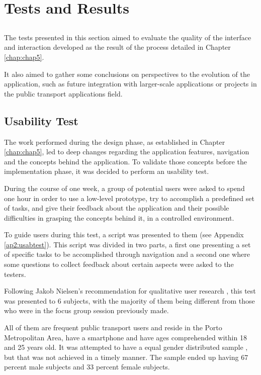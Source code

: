 \chapter{Tests and Results} \label{chap:chap6}

\section*{}

The tests presented in this section aimed to evaluate the quality of the interface and interaction developed as the result of the process detailed in Chapter \ref{chap:chap5}. 

It also aimed to gather some conclusions on perspectives to the evolution of the application, such as future integration with larger-scale applications or projects in the public transport applications field.

\section{Usability Test}

The work performed during the design phase, as established in Chapter \ref{chap:chap5}, led to deep changes regarding the application features, navigation and the concepts behind the application. To validate those concepts before the implementation phase, it was decided to perform an usability test.


During the course of one week, a group of potential users were asked to spend one hour in order to use a low-level prototype, try to accomplish a predefined set of tasks, and give their feedback about the application and their possible difficulties in grasping the concepts behind it, in a controlled environment.

To guide users during this test, a script was presented to them (see Appendix \ref{ap2:usabtest}). This script was divided in two parts, a first one presenting a set of specific tasks to be accomplished through navigation and a second one where some questions to collect feedback about certain aspects were asked to the testers.

Following Jakob Nielsen's recommendation for qualitative user research \cite{kn:NB12}, this test was presented to 6 subjects, with the majority of them being different from those who were in the focus group session previously made.

All of them are frequent public transport users and reside in the Porto Metropolitan Area, have a smartphone and have ages comprehended within 18 and 25 years old. It was attempted to have a equal gender distributed sample , but that was not achieved in a timely manner. The sample ended up having 67 percent male subjects and 33 percent female subjects.

